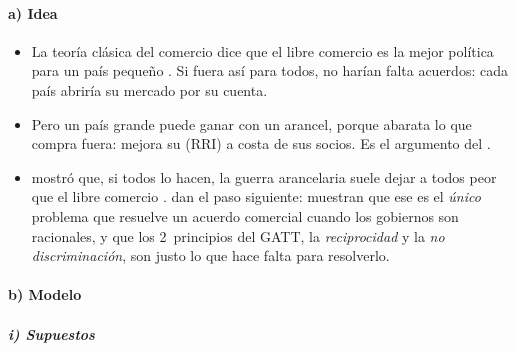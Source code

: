 \documentclass[11pt]{article}
\begin{document}
\paragraph{a) Idea}

\begin{itemize}
\item La teoría clásica del comercio dice que el libre comercio es la mejor política para un país pequeño . Si fuera así para todos, no harían falta acuerdos: cada país abriría su mercado por su cuenta.
\item Pero un país grande puede ganar con un arancel, porque abarata lo que compra fuera: mejora su  (RRI) a costa de sus socios. Es el argumento del  .
\item \textcite{Johnson1953Optimum} mostró que, si todos lo hacen, la guerra arancelaria suele dejar a todos peor que el libre comercio . \textcite{BagwellStaiger1999Economic} dan el paso siguiente: muestran que ese es el \emph{único} problema que resuelve un acuerdo comercial cuando los gobiernos son racionales, y que los 2~principios del GATT, la \emph{reciprocidad} y la \emph{no discriminación}, son justo lo que hace falta para resolverlo.
\end{itemize}

\paragraph{b) Modelo}

\subparagraph{i) Supuestos}
\end{document}
